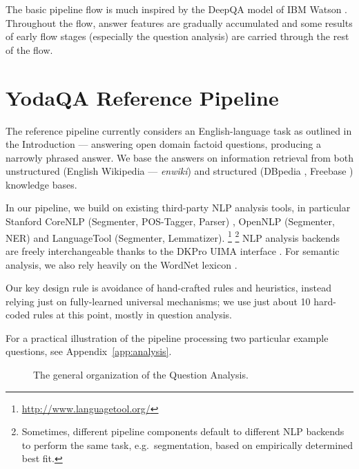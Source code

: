 The basic pipeline flow is much inspired by the Deep\-QA model
of IBM Watson \citep{WatsonPipeline}.  Throughout the flow, answer features
are gradually accumulated and some results of early flow stages (especially
the question analysis) are carried through the rest of the flow.


\section{YodaQA Reference Pipeline}
\label{sec:yodaqarefpip}

The reference pipeline currently considers an English-language task
as outlined in the Introduction --- answering open domain
factoid questions, producing a narrowly phrased answer.
We base the answers on information retrieval from both
unstructured (English Wikipedia --- \textit{enwiki})
and structured (DBpedia \citep{dbpedia}, Freebase \citep{freebase})
knowledge bases.

In our pipeline, we build on existing third-party NLP analysis tools,
in particular Stanford CoreNLP (Segmenter, POS-Tagger, Parser) \citep{StanfordCoreNLP} \citep{StanfordNNParser},
OpenNLP (Segmenter, NER) \citep{OpenNLP} and LanguageTool (Segmenter, Lemmatizer).%
\footnote{\url{http://www.languagetool.org/}}%
\footnote{Sometimes, different pipeline components default to different
NLP backends to perform the same task, e.g.\ segmentation,
based on empirically determined best fit.}
NLP analysis backends are freely interchangeable thanks
to the DKPro UIMA interface \citep{DKPro}.
For semantic analysis, we also rely heavily on the WordNet lexicon \citep{WordNet}.

Our key design rule is avoidance of hand-crafted rules and heuristics,
instead relying just on fully-learned universal mechanisms;
we use just about 10 hard-coded rules at this point, mostly
in question analysis.

For a practical illustration of the pipeline processing
two particular example questions,
see Appendix~\ref{app:analysis}.


\begin{figure}[hb]
\begin{center}
\caption{The general organization of the Question Analysis.}
\label{fig:arch-qa}
\end{center}
\end{figure}%

